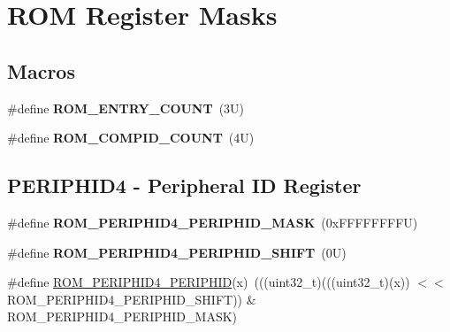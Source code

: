 \hypertarget{group___r_o_m___register___masks}{}\section{R\+OM Register Masks}
\label{group___r_o_m___register___masks}
\subsection*{Macros}
\begin{DoxyCompactItemize}
\item 
\mbox{\label{group___r_o_m___register___masks_gafe6371af1c87a0080eba2f5e2a8eba7e}} 
\#define {\bfseries R\+O\+M\+\_\+\+E\+N\+T\+R\+Y\+\_\+\+C\+O\+U\+NT}~(3\+U)
\item 
\mbox{\label{group___r_o_m___register___masks_ga7c28f9ff5985361d9571a2ea8609cd27}} 
\#define {\bfseries R\+O\+M\+\_\+\+C\+O\+M\+P\+I\+D\+\_\+\+C\+O\+U\+NT}~(4\+U)
\end{DoxyCompactItemize}
\subsection*{P\+E\+R\+I\+P\+H\+I\+D4 -\/ Peripheral ID Register}
\begin{DoxyCompactItemize}
\item 
\mbox{\label{group___m_t_b___register___masks_gad17e07925ea552218422be227581a58f}} 
\#define {\bfseries R\+O\+M\+\_\+\+P\+E\+R\+I\+P\+H\+I\+D4\+\_\+\+P\+E\+R\+I\+P\+H\+I\+D\+\_\+\+M\+A\+SK}~(0x\+F\+F\+F\+F\+F\+F\+F\+F\+U)
\item 
\mbox{\label{group___m_t_b___register___masks_ga4ea3b3a45be6eb8eb4372f565af2d5d9}} 
\#define {\bfseries R\+O\+M\+\_\+\+P\+E\+R\+I\+P\+H\+I\+D4\+\_\+\+P\+E\+R\+I\+P\+H\+I\+D\+\_\+\+S\+H\+I\+FT}~(0\+U)
\item 
\#define \mbox{\hyperlink{group___m_t_b___register___masks_gab4f815fbbdfce7ff4af7ddeca74eff41}{R\+O\+M\+\_\+\+P\+E\+R\+I\+P\+H\+I\+D4\+\_\+\+P\+E\+R\+I\+P\+H\+ID}}(x)~(((uint32\+\_\+t)(((uint32\+\_\+t)(x)) $<$$<$ R\+O\+M\+\_\+\+P\+E\+R\+I\+P\+H\+I\+D4\+\_\+\+P\+E\+R\+I\+P\+H\+I\+D\+\_\+\+S\+H\+I\+FT)) \& R\+O\+M\+\_\+\+P\+E\+R\+I\+P\+H\+I\+D4\+\_\+\+P\+E\+R\+I\+P\+H\+I\+D\+\_\+\+M\+A\+SK)
\end{DoxyCompactItemize}
